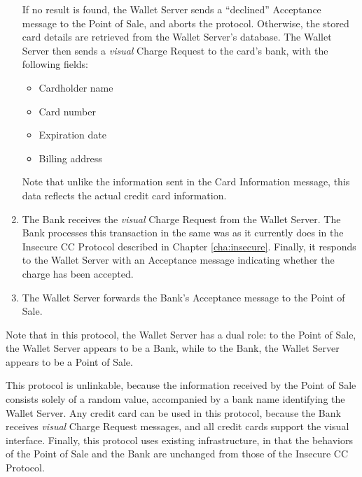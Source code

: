 \begin{enumerate}
    If no result is found, the Wallet Server sends a ``declined'' Acceptance message to the Point of Sale, and aborts the protocol.
	Otherwise, the stored card details are retrieved from the Wallet Server's database.
    The Wallet Server then sends a \emph{visual} Charge Request to the card's bank, with the following fields:
    \begin{itemize}
    \item Cardholder name
    \item Card number
    \item Expiration date
    \item Billing address
    \end{itemize}
    Note that unlike the information sent in the Card Information message, this data reflects the actual credit card information.
\item The Bank receives the \emph{visual} Charge Request from the Wallet Server.
    The Bank processes this transaction in the same was as it currently does in the Insecure CC Protocol described in Chapter \ref{cha:insecure}.
    Finally, it responds to the Wallet Server with an Acceptance message indicating whether the charge has been accepted.
\item The Wallet Server forwards the Bank's Acceptance message to the Point of Sale.
\end{enumerate}

Note that in this protocol, the Wallet Server has a dual role:
to the Point of Sale, the Wallet Server appears to be a Bank, while to the Bank, the Wallet Server appears to be a Point of Sale.

This protocol is unlinkable,
    because the information received by the Point of Sale consists solely of a random value, accompanied by a bank name identifying the Wallet Server.
Any credit card can be used in this protocol,
    because the Bank receives \emph{visual} Charge Request messages, and all credit cards support the visual interface.
Finally, this protocol uses existing infrastructure,
    in that the behaviors of the Point of Sale and the Bank are unchanged from those of the Insecure CC Protocol.
